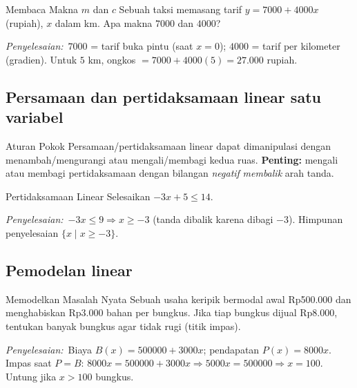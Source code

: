 \documentclass[11pt,a4paper]{report}
\theoremstyle{gaya}
\newcommand{\jawab}{\par\smallskip\noindent\textit{\textcolor{oranye}{Penyelesaian:}}\ }
\begin{document}
\begin{contoh}{Membaca Makna $m$ dan $c$}
Sebuah taksi memasang tarif $y=7000+4000x$ (rupiah), $x$ dalam km. Apa makna $7000$ dan $4000$?

\jawab $7000$ = tarif buka pintu (saat $x=0$); $4000$ = tarif per kilometer (gradien). Untuk $5$ km, ongkos $=7000+4000(5)=27{.}000$ rupiah.
\end{contoh}

\subsection*{Persamaan dan pertidaksamaan linear satu variabel}
\begin{konsep}{Aturan Pokok}
Persamaan/pertidaksamaan linear dapat dimanipulasi dengan menambah/mengurangi atau mengali/membagi kedua ruas. \textbf{Penting:} mengali atau membagi pertidaksamaan dengan bilangan \emph{negatif} \emph{membalik} arah tanda.
\end{konsep}

\begin{contoh}{Pertidaksamaan Linear}
Selesaikan $-3x+5\le 14$.

\jawab $-3x\le 9 \Rightarrow x\ge -3$ (tanda dibalik karena dibagi $-3$). Himpunan penyelesaian $\{x\mid x\ge-3\}$.
\end{contoh}

\subsection*{Pemodelan linear}
\begin{contoh}{Memodelkan Masalah Nyata}
Sebuah usaha keripik bermodal awal Rp500.000 dan menghabiskan Rp3.000 bahan per bungkus. Jika tiap bungkus dijual Rp8.000, tentukan banyak bungkus agar tidak rugi (titik impas).

\jawab Biaya $B(x)=500000+3000x$; pendapatan $P(x)=8000x$. Impas saat $P=B$: $8000x=500000+3000x\Rightarrow 5000x=500000\Rightarrow x=100$. Untung jika $x>100$ bungkus.
\end{contoh}
\end{document}
